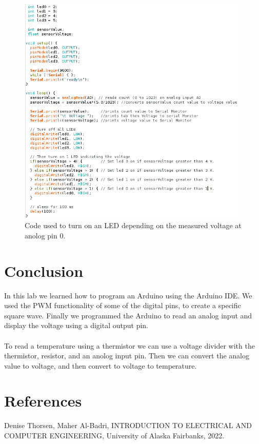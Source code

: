 \documentclass{article}
\begin{document}
\begin{figure}[H]
	\begin{center}
		\includegraphics[width=11cm]{code_part_2}
	\end{center}
	\caption{Code used to turn on an LED depending on the measured voltage at anolog pin 0.}
\end{figure}


\newpage
\section{Conclusion}
In this lab we learned how to program an Arduino using the Arduino IDE. We used the PWM functionality of some of the digital pins, to create a specific square wave. Finally we programmed the Arduino to read an analog input and display the voltage using a digital output pin.

\paragraph{}
To read a temperature using a thermistor we can use a voltage divider with the thermistor, resistor, and an anolog input pin. Then we can convert the analog value to voltage, and then convert to voltage to temperature.

\newpage
\section{References}
\noindent
[1] Denise Thorsen, Maher Al-Badri, INTRODUCTION TO ELECTRICAL AND COMPUTER ENGINEERING, University of Alaska Fairbanks, 2022.
\newline
\newline
\noindent
\end{document}
